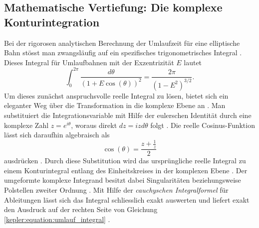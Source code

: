 %
%
%
%
\subsection{Mathematische Vertiefung: Die komplexe Konturintegration
    \label{kepler:subsection:komplexe_integration}}

Bei der rigorosen analytischen Berechnung der Umlaufzeit für eine elliptische Bahn stösst man zwangsläufig auf ein spezifisches trigonometrisches Integral \cite{nahin2010}.
Dieses Integral für Umlaufbahnen mit der Exzentrizität \(E\) lautet
\begin{equation}
    \int_{0}^{2\pi} \frac{d\theta}{(1+E \cos(\theta))^2} = \frac{2\pi}{(1-E^2)^{3/2}} .
    \label{kepler:equation:umlauf_integral}
\end{equation}
Um dieses zunächst anspruchsvolle reelle Integral zu lösen, bietet sich ein eleganter Weg über die Transformation in die komplexe Ebene an \cite{nahin2010}.
Man substituiert die Integrationsvariable mit Hilfe der eulerschen Identität durch eine komplexe Zahl \(z = e^{i\theta}\), woraus direkt \(dz = iz d\theta\) folgt \cite{nahin2010}.
Die reelle Cosinus-Funktion lässt sich daraufhin algebraisch als
\begin{equation}
    \cos(\theta) = \frac{z + \frac{1}{z}}{2}
    \label{kepler:equation:cosinus_komplex}
\end{equation}
ausdrücken \cite{nahin2010}.
Durch diese Substitution wird das ursprüngliche reelle Integral zu einem Konturintegral entlang des Einheitskreises in der komplexen Ebene \cite{nahin2010}.
Der umgeformte komplexe Integrand besitzt dabei Singularitäten beziehungsweise Polstellen zweiter Ordnung \cite{nahin2010}.
Mit Hilfe der \emph{cauchyschen Integralformel} für Ableitungen lässt sich das Integral schliesslich exakt auswerten und liefert exakt den Ausdruck auf der rechten Seite von Gleichung \eqref{kepler:equation:umlauf_integral} \cite{nahin2010}.

